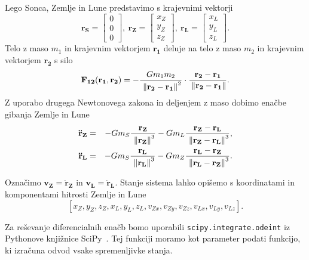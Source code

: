 \documentclass[a4paper,12pt]{article}
\renewcommand{\vec}[1]{\mathbf{#1}} %
\begin{document}
\noindent
Lego Sonca, Zemlje in Lune predstavimo s krajevnimi vektorji
\begin{equation*}
    \vec{r_S} =
    \begin{bmatrix}
        0 \\ 0 \\ 0
    \end{bmatrix},\ 
    \vec{r_Z} = 
    \begin{bmatrix}
        x_Z \\ y_Z \\ z_Z
    \end{bmatrix},\ 
    \vec{r_L} = 
    \begin{bmatrix}
        x_L \\ y_L \\ z_L
    \end{bmatrix}.
\end{equation*}
Telo z maso $m_1$ in krajevnim vektorjem $\vec{r_1}$ deluje na 
telo z maso $m_2$ in krajevnim vektorjem $\vec{r_2}$ s silo
\begin{equation*}
    \vec{F_{12}} (\vec{r_1},\vec{r_2}) = -\frac{G m_1 m_2}
    {\ \norm{\vec{r_2}-\vec{r_1}}^2} \cdot 
    \frac{\vec{r_2}-\vec{r_1}}{\: \norm{\vec{r_2}-\vec{r_1}}}.
\end{equation*}
Z uporabo drugega Newtonovega zakona in deljenjem z maso dobimo enačbe gibanja
Zemlje in Lune
\begin{eqnarray}
    \vec{\ddot{r}_Z} &=& -Gm_S\frac{\vec{r_Z}}{\ \norm{\vec{r_Z}}^3}
    -Gm_L\frac{\vec{r_Z-r_L}}{\ \norm{\vec{r_Z}-\vec{r_L}}^3}, \nonumber \\
    \vec{\ddot{r}_L} &=& -Gm_S\frac{\vec{r_L}}{\ \norm{\vec{r_L}}^3}
    -Gm_Z\frac{\vec{r_L}-\vec{r_Z}}{\ \norm{\vec{r_L}-\vec{r_Z}}^3}. \nonumber
\end{eqnarray}

\noindent
Označimo $\vec{v_Z} = \vec{\dot{r}_Z}$ in $\vec{v_L} = \vec{\dot{r}_L}$.
Stanje sistema lahko opišemo s koordinatami in komponentami hitrosti 
Zemlje in Lune
\begin{equation*}
    \left[x_Z, y_Z, z_Z, x_L, y_L, z_L, v_{Zx}, v_{Zy}, v_{Zz}, v_{Lx}, 
    v_{Ly}, v_{Lz}\right]. 
\end{equation*}

\noindent
Za reševanje diferencialnih enačb bomo uporabili \texttt{scipy.integrate.odeint} 
iz Pythonove knjižnice SciPy~\cite{odeint}. Tej funkciji moramo kot parameter 
podati funkcijo, ki izračuna odvod vsake spremenljivke stanja.
\end{document}
